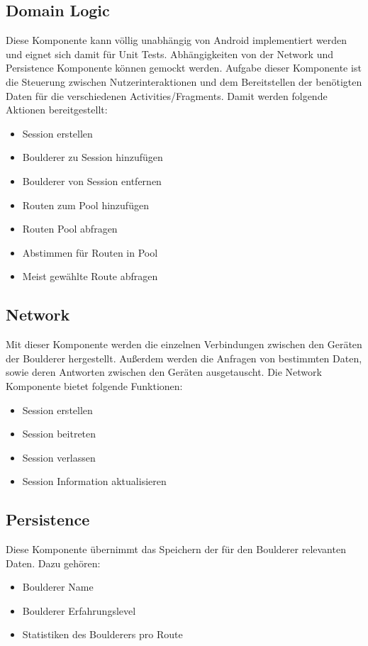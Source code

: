 \documentclass[11pt,a4paper,headsepline,footsepline,bibliography=totocnumbered]{article}
\begin{document}
  \subsection{Domain Logic}
    \par
      Diese Komponente kann völlig unabhängig von Android implementiert werden und eignet sich damit für Unit Tests. Abhängigkeiten von der Network und Persistence Komponente können gemockt werden.
      Aufgabe dieser Komponente ist die Steuerung zwischen Nutzerinteraktionen und dem Bereitstellen der benötigten Daten für die verschiedenen Activities/Fragments.
      Damit werden folgende Aktionen bereitgestellt:
      \begin{itemize}
        \item Session erstellen
        \item Boulderer zu Session hinzufügen
        \item Boulderer von Session entfernen
        \item Routen zum Pool hinzufügen
        \item Routen Pool abfragen
        \item Abstimmen für Routen in Pool
        \item Meist gewählte Route abfragen
      \end{itemize}

  \subsection{Network}
    \par
      Mit dieser Komponente werden die einzelnen Verbindungen zwischen den Geräten der Boulderer hergestellt. Außerdem werden die Anfragen von bestimmten Daten, sowie deren Antworten zwischen den Geräten ausgetauscht.
      Die Network Komponente bietet folgende Funktionen:
      \begin{itemize}
        \item Session erstellen
        \item Session beitreten
        \item Session verlassen
        \item Session Information aktualisieren
      \end{itemize}

  \subsection{Persistence}
    \par
      Diese Komponente übernimmt das Speichern der für den Boulderer relevanten Daten.
      Dazu gehören:
      \begin{itemize}
        \item Boulderer Name
        \item Boulderer Erfahrungslevel
        \item Statistiken des Boulderers pro Route
      \end{itemize}
\end{document}
